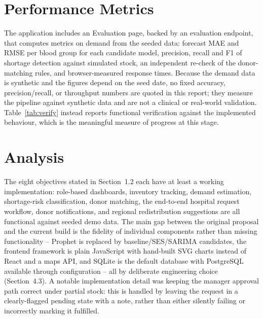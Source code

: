 \documentclass[12pt,a4paper,twoside]{report}
\begin{document}
\section{Performance Metrics}
The application includes an Evaluation page, backed by an evaluation endpoint, that computes metrics on demand from the seeded data: forecast MAE and RMSE per blood group for each candidate model, precision, recall and F1 of shortage detection against simulated stock, an independent re-check of the donor-matching rules, and browser-measured response times. Because the demand data is synthetic and the figures depend on the seed date, no fixed accuracy, precision/recall, or throughput numbers are quoted in this report; they measure the pipeline against synthetic data and are not a clinical or real-world validation. Table~\ref{tab:verify} instead reports functional verification against the implemented behaviour, which is the meaningful measure of progress at this stage.

\section{Analysis}
The eight objectives stated in Section~1.2 each have at least a working implementation: role-based dashboards, inventory tracking, demand estimation, shortage-risk classification, donor matching, the end-to-end hospital request workflow, donor notifications, and regional redistribution suggestions are all functional against seeded demo data. The main gap between the original proposal and the current build is the fidelity of individual components rather than missing functionality -- Prophet is replaced by baseline/SES/SARIMA candidates, the frontend framework is plain JavaScript with hand-built SVG charts instead of React and a maps API, and SQLite is the default database with PostgreSQL available through configuration -- all by deliberate engineering choice (Section~4.3). A notable implementation detail was keeping the manager approval path correct under partial stock: this is handled by leaving the request in a clearly-flagged pending state with a note, rather than either silently failing or incorrectly marking it fulfilled.
\end{document}
